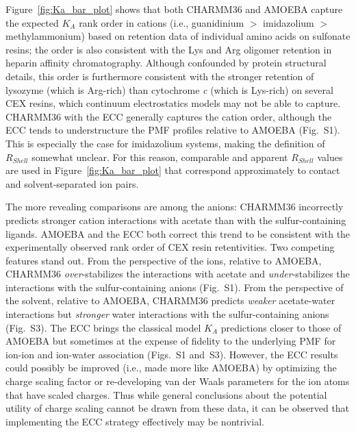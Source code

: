 \documentclass[journal=jpclcd,manuscript=article,articletitle=true,layout=twocolumn]{achemso}
\begin{document}
Figure~\ref{fig:Ka_bar_plot} shows that both CHARMM36 and AMOEBA capture the expected $K_A$ rank order in cations (i.e., guanidinium $>$ imidazolium $>$ methylammonium) based on retention data of individual amino acids on sulfonate resins;\cite{Wang1989, Moore1958} the order is also consistent with the Lys and Arg oligomer retention in heparin affinity chromatography.\cite{Fromm1995} Although confounded by protein structural details, this order is furthermore consistent with the stronger retention of lysozyme (which is Arg-rich) than cytochrome \emph{c} (which is Lys-rich) on several CEX resins, which continuum electrostatics models may not be able to capture.\cite{DePhillips2001, Yao2005} CHARMM36 with the ECC generally captures the cation order, although the ECC tends to understructure the PMF profiles relative to AMOEBA (Fig.~S1). This is especially the case for imidazolium systems, making the definition of $R_{Shell}$ somewhat unclear. For this reason, comparable and apparent $R_{Shell}$ values are used in Figure~\ref{fig:Ka_bar_plot} that correspond approximately to contact and solvent-separated ion pairs. 

The more revealing comparisons are among the anions: CHARMM36 incorrectly predicts stronger cation interactions with acetate than with the sulfur-containing ligands. AMOEBA and the ECC both correct this trend to be consistent with the experimentally observed rank order of CEX resin retentivities. Two competing features stand out. From the perspective of the ions, relative to AMOEBA, CHARMM36 \emph{over}-stabilizes the interactions with acetate and \emph{under}-stabilizes the interactions with the sulfur-containing anions  (Fig.~S1). From the perspective of the solvent, relative to AMOEBA, CHARMM36 predicts \emph{weaker} acetate-water interactions but \emph{stronger} water interactions with the sulfur-containing anions (Fig.~S3). The ECC brings the classical model $K_A$ predictions closer to those of AMOEBA but sometimes at the expense of fidelity to the underlying PMF for ion-ion and ion-water association (Figs.~S1 and~S3). However, the ECC results could possibly be improved (i.e., made more like AMOEBA) by optimizing the charge scaling factor\cite{Dijon2020} or re-developing van der Waals parameters for the ion atoms that have scaled charges. Thus while general conclusions about the potential utility of charge scaling cannot be drawn from these data, it can be observed that implementing the ECC strategy effectively may be nontrivial. 
\end{document}
